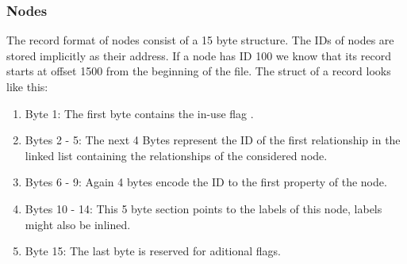 \documentclass[a4paper,10pt]{article}
\begin{document}
    \subsubsection{Nodes}
    The record format of nodes consist of a 15 byte structure. The IDs of nodes are stored implicitly as their address. If a node has ID 100 we know that its record starts at offset 1500 from the beginning of the file. The struct of a record looks like this:
    \begin{enumerate}
     \item Byte 1: The first byte contains the in-use flag .
     \item Bytes 2 - 5: The next 4 Bytes represent the ID of the first relationship in the linked list containing the relationships of the considered node.
     \item Bytes 6 - 9: Again 4 bytes encode the ID to the first property of the node.
     \item Bytes 10 - 14: This 5 byte section points to the labels of this node, labels might also be inlined.
     \item Byte 15: The last byte is reserved for aditional flags.
    \end{enumerate}
\end{document}
